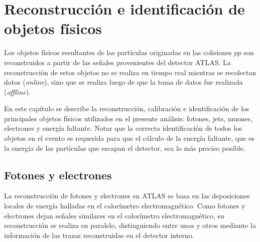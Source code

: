 \chapter{Reconstrucción e identificación de objetos físicos}
\label{cap:objetos}

Los objetos físicos resultantes de las partículas originadas en las colisiones
$pp$ son reconstruidos a partir de las señales provenientes del detector ATLAS.
La reconstrucción de estos objetos no se realiza en tiempo real mientras se
recolectan datos (\emph{online}), sino que se realiza luego de que la toma de
datos fue realizada (\emph{offline}).

En este capítulo se describe la reconstrucción, calibración e identificación de
los principales objetos físicos utilizados en el presente análisis: fotones,
jets, muones, electrones y energía faltante. Notar que la correcta
identificación de todos los objetos en el evento es requerida para que el
cálculo de la energía faltante, que es la energía de las partículas que escapan
el detector, sea lo más preciso posible.









\section{Fotones y electrones}
\label{sec:obj_photons}

La reconstrucción de fotones y electrones en ATLAS se basa en las deposiciones
locales de energía halladas en el calorímetro electromagnético. Como fotones y
electrones dejan señales similares en el calorímetro electromagnético, su
reconstrucción se realiza en paralelo, distinguiendo entre unos y otros
mediante la información de las trazas reconstruidas en el detector
interno.

